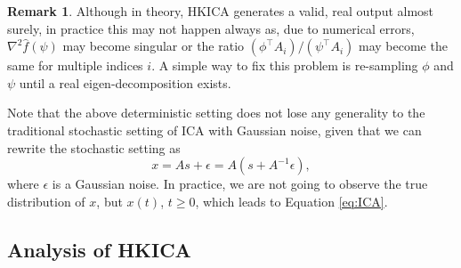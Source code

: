 \documentclass{article}
\theoremstyle{definition}
\newtheorem{remark}[lemma]{Remark}
\newcommand{\eps}{\epsilon}
\begin{document}
\begin{remark}%
\label{rmk:symmetrization} 
Although in theory, HKICA generates a valid, real output almost surely, in practice this may not happen always as, due to numerical errors, $\nabla^2\hat{f}(\psi)$ may become singular or the ratio $(\phi^\top A_i)/(\psi^\top A_i)$ may become the same for multiple indices $i$. A simple way to fix this problem is re-sampling $\phi$ and $\psi$ until a real eigen-decomposition exists.

\end{remark}

Note that the above deterministic setting does not lose any generality to the traditional stochastic setting of ICA with Gaussian noise, given that we can rewrite the stochastic setting as 
\[
x = As+\eps = A(s+A^{-1}\eps),
\] 
where $\eps$ is a Gaussian noise. In practice, we are not going to observe the true distribution of $x$, but $x(t)$, $t\ge 0$, which leads to Equation \eqref{eq:ICA}.
\fi


\subsection{Analysis of HKICA}
\label{sec:AnalysisHK}
\end{document}
